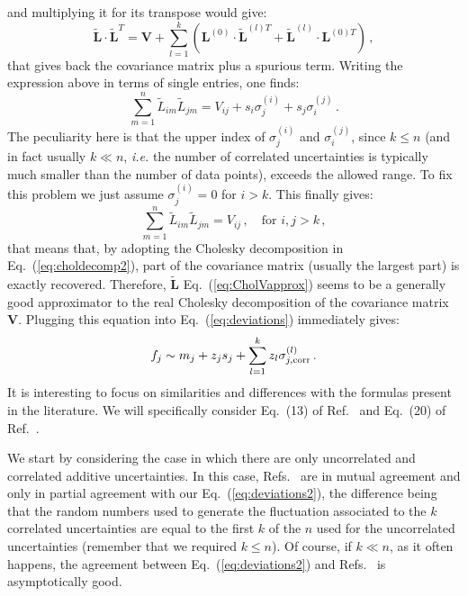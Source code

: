 \documentclass[10pt,a4paper]{article}
\begin{document}
and multiplying it for its transpose would give:
\begin{equation}
\widetilde{\mathbf{L}}\cdot \widetilde{\mathbf{L}}^T = \mathbf{V} + \sum_{l=1}^k\left(\mathbf{L}^{(0)}\cdot \widetilde{\mathbf{L}}^{(l)T}+\widetilde{\mathbf{L}}^{(l)}\cdot \mathbf{L}^{(0)T}\right)\,,
\end{equation}
that gives back the covariance matrix plus a spurious term. Writing
the expression above in terms of single entries, one finds:
\begin{equation}
\sum_{m=1}^n\widetilde{L}_{im}\widetilde{L}_{jm} = V_{ij} + s_i \sigma_{j}^{(i)}+s_j\sigma_{i}^{(j)}\,.
\end{equation}
The peculiarity here is that the upper index of $\sigma_{j}^{(i)}$ and
$\sigma_{i}^{(j)}$, since $k\leq n$ (and in fact usually $k\ll n$,
\textit{i.e.} the number of correlated uncertainties is typically much
smaller than the number of data points), exceeds the allowed range. To
fix this problem we just assume $\sigma_{j}^{(i)}=0$ for $i>k$. This
finally gives:
\begin{equation}
\sum_{m=1}^n\widetilde{L}_{im}\widetilde{L}_{jm} = V_{ij}\,,\quad
\mbox{for } i,j>k\,,
\end{equation}
that means that, by adopting the Cholesky decomposition in
Eq.~(\ref{eq:choldecomp2}), part of the covariance matrix (usually the
largest part) is exactly recovered. Therefore,
$\widetilde{\mathbf{L}}$ Eq.~(\ref{eq:CholVapprox}) seems to be a
generally good approximator to the real Cholesky decomposition of the
covariance matrix $\mathbf{V}$. Plugging this equation into
Eq.~(\ref{eq:deviations}) immediately gives:
\begin{equation}\label{eq:deviations2}
  f_j\sim m_j+z_js_j + \sum_{l=1}^{k}z_l \sigma_{j,\rm
    corr}^{(l)}\,.
\end{equation}
It is interesting to focus on similarities and differences with the
formulas present in the literature. We will specifically consider
Eq.~(13) of Ref.~\cite{Ball:2008by} and Eq.~(20) of
Ref.~\cite{Ball:2014uwa}.

We start by considering the case in which there are only uncorrelated
and correlated additive uncertainties. In this case,
Refs.~\cite{Ball:2008by, Ball:2014uwa} are in mutual agreement and
only in partial agreement with our Eq.~(\ref{eq:deviations2}), the
difference being that the random numbers used to generate the
fluctuation associated to the $k$ correlated uncertainties are equal
to the first $k$ of the $n$ used for the uncorrelated uncertainties
(remember that we required $k\leq n$). Of course, if $k\ll n$, as it
often happens, the agreement between Eq.~(\ref{eq:deviations2}) and
Refs.~\cite{Ball:2008by, Ball:2014uwa} is asymptotically good.
\end{document}

